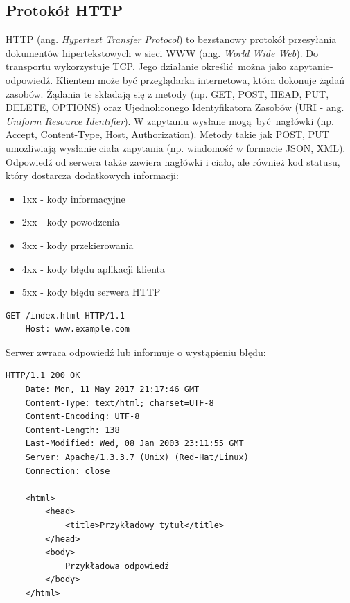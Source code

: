\subsection{Protokół HTTP}

\label{HTTP_section}
HTTP (ang. \textit{Hypertext Transfer Protocol}) to bezstanowy protokół przesyłania dokumentów hipertekstowych w sieci WWW (ang. \textit{World Wide Web}). Do transportu wykorzystuje TCP. Jego działanie określić można jako zapytanie-odpowiedź. Klientem może być przeglądarka internetowa, która dokonuje żądań zasobów. Żądania te składają się z metody (np. GET, POST, HEAD, PUT, DELETE, OPTIONS) oraz Ujednoliconego Identyfikatora Zasobów (URI - ang. \textit{Uniform Resource Identifier}). W zapytaniu wysłane mogą być nagłówki (np. Accept, Content-Type, Host, Authorization). Metody takie jak POST, PUT umożliwiają wysłanie ciała zapytania (np. wiadomość w formacie JSON, XML). Odpowiedź od serwera także zawiera nagłówki i ciało, ale również kod statusu, który dostarcza dodatkowych informacji:
\begin{itemize}
  \item 1xx - kody informacyjne
  \item 2xx - kody powodzenia
  \item 3xx - kody przekierowania
  \item 4xx - kody błędu aplikacji klienta
  \item 5xx - kody błędu serwera HTTP
\end{itemize}


\begin{lstlisting}[caption={Przykład żądania HTTP},captionpos=b]
    GET /index.html HTTP/1.1
    Host: www.example.com
\end{lstlisting}

Serwer zwraca odpowiedź lub informuje o wystąpieniu błędu:

\begin{lstlisting}[caption={Przykład odpowiedzi serwera ze statusem 200 OK},captionpos=b]
    HTTP/1.1 200 OK
    Date: Mon, 11 May 2017 21:17:46 GMT
    Content-Type: text/html; charset=UTF-8
    Content-Encoding: UTF-8
    Content-Length: 138
    Last-Modified: Wed, 08 Jan 2003 23:11:55 GMT
    Server: Apache/1.3.3.7 (Unix) (Red-Hat/Linux)
    Connection: close

    <html>
        <head>
            <title>Przykładowy tytuł</title>
        </head>
        <body>
            Przykładowa odpowiedź
        </body>
    </html>
\end{lstlisting}


